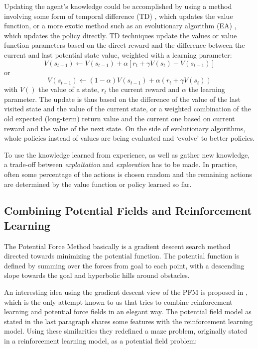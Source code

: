 \documentclass[11pt]{article}
\begin{document}
Updating the agent's knowledge could be accomplished by using a method involving some form of temporal difference (TD) \cite[p.133-157]{sutton98}, which updates the value function, or a more exotic method such as an evolutionary algorithm (EA) \cite{li-juan08}, which updates the policy directly. TD techniques update the values or value function parameters based on the direct reward and the difference between the current and last potential state value, weighted with a learning parameter:
 \[ V(s_{t-1}) \leftarrow V(s_{t-1}) + \alpha [ r_t + \gamma V(s_t) - V(s_{t-1}) ] \]
or
 \[ V(s_{t-1}) \leftarrow (1 - \alpha) V(s_{t-1}) + \alpha ( r_t + \gamma V(s_t) ) \]
with $V()$ the value of a state, $r_t$ the current reward and $\alpha$ the learning parameter. The update is thus based on the difference of the value of the last visited state and the value of the current state, or a weighted combination of the old expected (long-term) return value and the current one based on current reward and the value of the next state. On the side of evolutionary algorithms, whole policies instead of values are being evaluated and `evolve' to better policies.

To use the knowledge learned from experience, as well as gather new knowledge, a trade-off between \emph{exploitation} and \emph{exploration} has to be made. In practice, often some percentage of the actions is chosen random and the remaining actions are determined by the value function or policy learned so far.

\subsection{Combining Potential Fields and Reinforcement Learning}


The Potential Force Method basically is a gradient descent search method directed towards minimizing the potential function. The potential function is defined by summing over the forces from goal to each point, with a descending slope towards the goal and hyperbolic hills around obstacles.

An interesting idea using the gradient descent view of the PFM is proposed in \cite{li-juan08}, which is the only attempt known to us that tries to combine reinforcement learning and potential force fields in an elegant way. The potential field model as stated in the last paragraph shares some features with the reinforcement learning model. Using these similarities they redefined a maze problem, originally stated in a reinforcement learning model, as a potential field problem:
\end{document}
